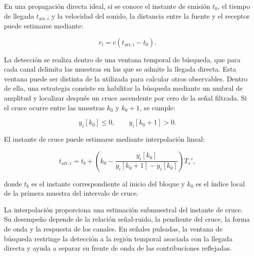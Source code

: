 En una propagación directa ideal, si se conoce el instante de emisión
$t_0$, el tiempo de llegada $t_{\mathrm{arr},i}$ y la velocidad del
sonido, la distancia entre la fuente y el receptor puede estimarse
mediante:

\begin{equation}
    r_i
    =
    c
    \left(
        t_{\mathrm{arr},i}-t_0
    \right).
    \label{eq:distancia_toa}
\end{equation}

La detección se realiza dentro de una ventana temporal de búsqueda,
que para cada canal delimita las muestras en las que se admite la
llegada directa. Esta ventana puede ser distinta de la utilizada para
calcular otros observables. Dentro de ella, una estrategia consiste
en habilitar la búsqueda mediante un umbral de amplitud y localizar
después un cruce ascendente por cero de la señal filtrada. Si el cruce
ocurre entre las muestras $k_0$ y $k_0+1$, se cumple:

\begin{equation}
    y_i[k_0]\leq 0,
    \qquad
    y_i[k_0+1]>0.
    \label{eq:cruce_cero}
\end{equation}

El instante de cruce puede estimarse mediante interpolación lineal:

\begin{equation}
    t_{\mathrm{arr},i}
    =
    t_b+
    \left(
        k_0
        -
        \frac{y_i[k_0]}
        {y_i[k_0+1]-y_i[k_0]}
    \right)T_s',
    \label{eq:interpolacion_secante}
\end{equation}

donde $t_b$ es el instante correspondiente al inicio del bloque y
$k_0$ es el índice local de la primera muestra del intervalo de cruce.

La interpolación proporciona una estimación submuestral del instante
de cruce. Su desempeño depende de la relación señal-ruido, la pendiente
del cruce, la forma de onda y la respuesta de los canales. En señales
pulsadas, la ventana de búsqueda restringe la detección a la región
temporal asociada con la llegada directa y ayuda a separar su frente de onda de las
contribuciones reflejadas.


